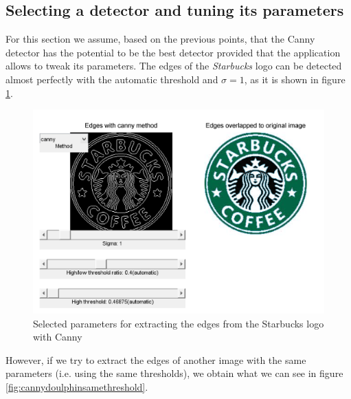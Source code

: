 \subsection{Selecting a detector and tuning its parameters}

For this section we assume, based on the previous points, that the Canny detector has the potential
to be the best detector provided that the application allows to tweak its parameters. The edges of the
\emph{Starbucks} logo can be detected almost perfectly with the automatic threshold and $\sigma = 1$,
as it is shown in figure \ref{fig:cannystarbucks}.

\begin{figure}[!hbt]
  \includegraphics[width=\textwidth]{./img/ex1/canny_gui_starbucks_opt.png}
  \caption{Selected parameters for extracting the edges from the Starbucks logo with Canny}
  \label{fig:cannystarbucks}
\end{figure}

However, if we try to extract the edges of another image with the same parameters
(i.e. using the same thresholds), we obtain what we can see in figure
\ref{fig:cannydoulphinsamethreshold}.

